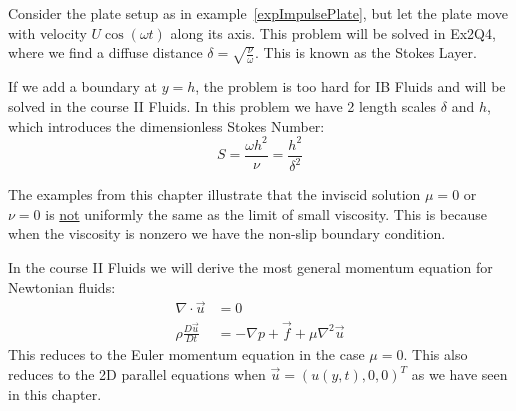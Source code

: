 \documentclass[../Main.tex]{subfiles}
\begin{document}
\begin{example}
    Consider the plate setup as in example~\ref{expImpulsePlate}, but let the plate move with velocity $U\cos(\omega t)$ along its axis. This problem will be solved in Ex2Q4, where we find a diffuse distance $\delta = \sqrt{\frac{\nu}{\omega}}$. This is known as the Stokes Layer.

    If we add a boundary at $y = h$, the problem is too hard for IB Fluids and will be solved in the course II Fluids. In this problem we have 2 length scales $\delta$ and $h$, which introduces the dimensionless Stokes Number:
    \begin{equation*}
        S = \frac{\omega h^2}{\nu} = \frac{h^2}{\delta^2}
    \end{equation*}
    \label{expImpulsePlate3}
\end{example}
\begin{remark}
    The examples from this chapter illustrate that the inviscid solution $\mu = 0$ or $\nu = 0$ is \underline{not} uniformly the same as the limit of small viscosity. This is because when the viscosity is nonzero we have the non-slip boundary condition.
\end{remark}
In the course II Fluids we will derive the most general momentum equation for Newtonian fluids:
\begin{align*}
    \nabla \cdot \vec{u} &= 0 \\
    \rho \frac{D \vec{u}}{D t} &= - \nabla p + \vec{f} + \mu \nabla^2 \vec{u}
\end{align*}
This reduces to the Euler momentum equation in the case $\mu = 0$. This also reduces to the 2D parallel equations when $\vec{u} = (u(y, t), 0, 0)^T$ as we have seen in this chapter.
\end{document}
